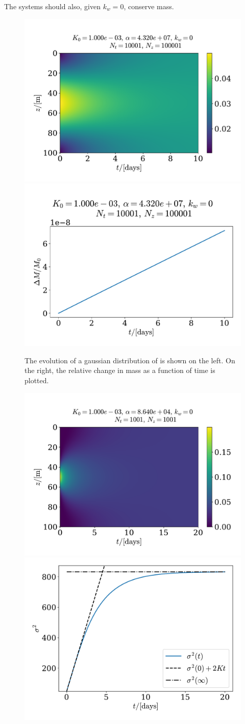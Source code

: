 \documentclass{article}
\begin{document}
    The systems should also, given $k_w=0$, conserve mass.

    \begin{figure}
        \centering
        \includegraphics[width=.49\textwidth]{../plots/test2_c}
        \includegraphics[width=.49\textwidth]{../plots/test2_m}
        \caption{The evolution of a gaussian distribution of  is shown on the left. On the right, the relative change in mass as a function of time is plotted. }
        \label{Consv mass}
    \end{figure}


    \begin{figure}
        \centering
        \includegraphics[width=.49\textwidth]{../plots/test3}
        \includegraphics[width=.49\textwidth]{../plots/test3_var}
        \caption{}
        \label{var}
    \end{figure}
\end{document}

